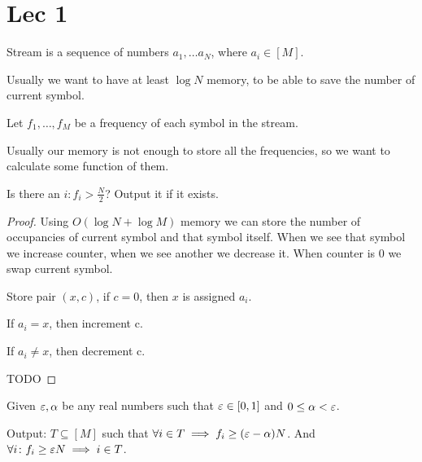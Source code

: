
\section{Lec 1}

\begin{df}[Stream]
	Stream is a sequence of numbers $a_1, \ldots a_N$, where  $a_i \in [M]$. 

	Usually we want to have at least $\log N$ memory, to be able to save the number of current symbol.
\end{df}

\begin{df}
	Let $f_1, \ldots, f_M$ be a frequency of each symbol in the stream.

	Usually our memory is not enough to store all the frequencies, so we want to calculate some function of them.
\end{df}

\begin{problem}
	Is there an $i \colon f_i > \frac{N}{2}$? Output it if it exists.
\end{problem}

\begin{proof}
	Using $O(\log N + \log M)$ memory we can store the number of occupancies of current symbol and that symbol itself. When we see that symbol we increase counter, when we see another we decrease it. When counter is 0 we swap current symbol.

	Store pair $(x, c)$, if $c = 0$, then $x$ is assigned $a_i$. 

	If $a_i = x$, then increment c.

	If  $a_i \neq x$, then decrement c.

	TODO
\end{proof}

\begin{problem}
	Given $\varepsilon, \alpha$ be any real numbers such that $\varepsilon \in [0, 1]$ and  $0 \leq \alpha < \varepsilon$.

	Output: $T \subseteq [M]$ such that  $\forall i \in T \implies f_i \geq (\varepsilon - \alpha) N$.
	And  $\forall i \colon f_i \geq \varepsilon N \implies i \in T$.
\end{problem}

